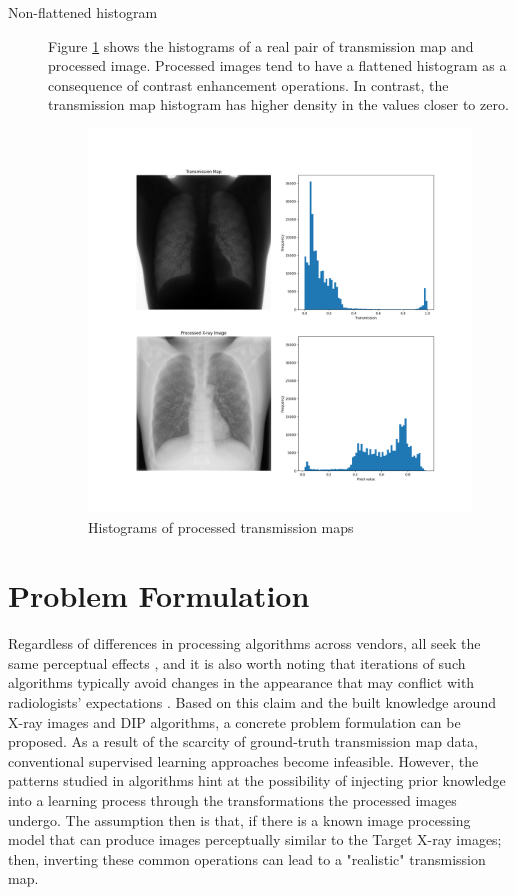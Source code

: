\documentclass[nomenclature, english, bibtex]{kththesis}
\numberwithin{listing}{chapter}
\begin{document}
\begin{description}
    \item[Non-flattened histogram] Figure \ref{fig:processedHistogramCompare} shows the histograms of a real pair of transmission map
    and processed image. Processed images tend to have a flattened histogram as a consequence of
    contrast enhancement operations. In contrast, the transmission map histogram has higher
    density in the values closer to zero.
    \begin{figure}[H]
        \centering
        \includegraphics[width=1.0\textwidth]{figures/processed_hist_cmp.png}
        \caption{Histograms of processed transmission maps}
        \label{fig:processedHistogramCompare}
    \end{figure}
\end{description}


\chapter{Problem Formulation}


Regardless of differences in processing algorithms across vendors, all seek the same perceptual effects
\cite[p.~119]{carterDigitalRadiographyPACS2010}, and it is also worth noting that iterations of such algorithms typically
avoid changes in the appearance that may conflict with radiologists' expectations \cite[p.~57]{STA00a}.
Based on this claim and the built knowledge around X-ray images and \acrfull{DIP} algorithms, a concrete problem
formulation can be proposed. As a result of the scarcity of ground-truth transmission map data, conventional supervised learning
approaches become infeasible. However, the patterns studied in  algorithms hint at the possibility
of injecting prior knowledge into a learning process through the transformations the processed images undergo.
The assumption then is that, if there is a known image processing model that can produce images perceptually similar to the
Target X-ray images; then, inverting these common operations can lead to a "realistic" transmission map.
\end{document}
